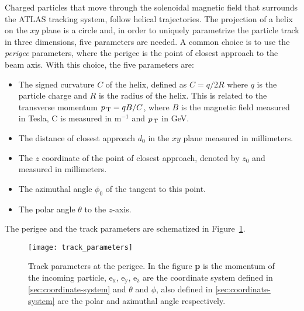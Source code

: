 Charged particles that move through the solenoidal magnetic field that surrounds
the ATLAS tracking system, follow helical trajectories. The projection of a
helix on the $xy$ plane is a circle and, in order to uniquely parametrize the
particle track in three dimensions, five parameters are needed. A common choice
is to use the \emph{perigee} parameters, where the perigee is the point of
closest approach to the beam axis. With this choice, the five parameters are:
\begin{itemize}
\item The signed curvature $C$ of the helix, defined as $C = q / 2R$ where $q$
  is the particle charge and $R$ is the radius of the helix. This is related to
  the transverse momentum $p_\mathrm{\, T} = qB / C$, where $B$ is the magnetic field
  measured in Tesla, C is measured in m$^{-1}$ and $p_\mathrm{\, T}$ in GeV.
\item The distance of closest approach $d_0$ in the $xy$ plane measured in
  millimeters.
\item The $z$ coordinate of the point of closest approach, denoted by $z_0$ and
  measured in millimeters.
\item The azimuthal angle $\phi_0$ of the tangent to this point.
\item The polar angle $\theta$ to the $z$-axis.
\end{itemize}
The perigee and the track parameters are schematized in
Figure~\ref{fig:track_par}.
\begin{figure}[!h]
  \centering
    \texttt{[image: track\_parameters]}
    \caption{Track parameters at the perigee. In the figure \textbf{p} is the
      momentum of the incoming particle, e$_\mathrm{x}$, e$_\mathrm{y}$,
      e$_\mathrm{z}$ are the coordinate system defined in
      \cref{sec:coordinate-system} and $\theta$ and $\phi$, also defined in
      \cref{sec:coordinate-system} are the polar and azimuthal angle
      respectively.}
    \label{fig:track_par}
\end{figure}
